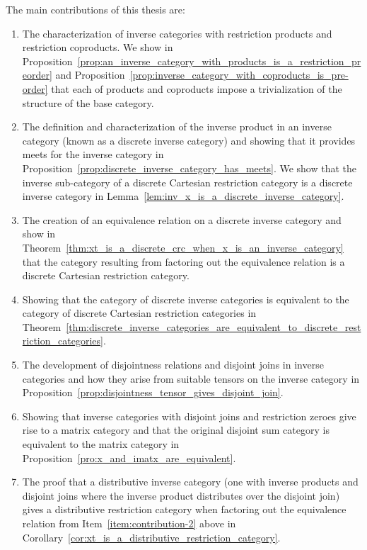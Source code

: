 The main contributions of this thesis are:
\begin{enumerate}
\item The characterization of inverse categories with restriction products and restriction
  coproducts.  We show in
  Proposition~\ref{prop:an_inverse_category_with_products_is_a_restriction_preorder} and
  Proposition~\ref{prop:inverse_category_with_coproducts_is_pre-order} that each of products and
  coproducts impose a trivialization of the structure of the base category.

\item The definition and characterization of the inverse product in an inverse category (known as a
  discrete inverse category) and showing  that it provides meets for the inverse category  in
  Proposition~\ref{prop:discrete_inverse_category_has_meets}. We show that the inverse sub-category
  of a discrete Cartesian restriction category is a discrete inverse category in
  Lemma~\ref{lem:inv_x_is_a_discrete_inverse_category}.
\item The creation of an equivalence relation on a discrete inverse category and show in
  Theorem~\ref{thm:xt_is_a_discrete_crc_when_x_is_an_inverse_category} that the category resulting
  from factoring out the equivalence relation is a discrete Cartesian restriction
  category.\label{item:contribution-2}
\item Showing that the category of discrete inverse categories is equivalent to the category of
  discrete Cartesian restriction categories in
  Theorem~\ref{thm:discrete_inverse_categories_are_equivalent_to_discrete_restriction_categories}.
\item The development of disjointness relations and disjoint joins in inverse categories and how
  they arise from suitable tensors on the inverse category in
  Proposition~\ref{prop:disjointness_tensor_gives_disjoint_join}.
\item Showing that inverse categories with disjoint joins and restriction zeroes give rise to a
  matrix category and that the original disjoint sum category is equivalent to the matrix category
  in Proposition~\ref{pro:x_and_imatx_are_equivalent}.
\item The proof that a distributive inverse category (one with inverse products and disjoint joins
  where the inverse product distributes over the disjoint join) gives a distributive restriction
  category when factoring out the equivalence relation from Item~\ref{item:contribution-2} above in
  Corollary~\ref{cor:xt_is_a_distributive_restriction_category}.
\end{enumerate}

